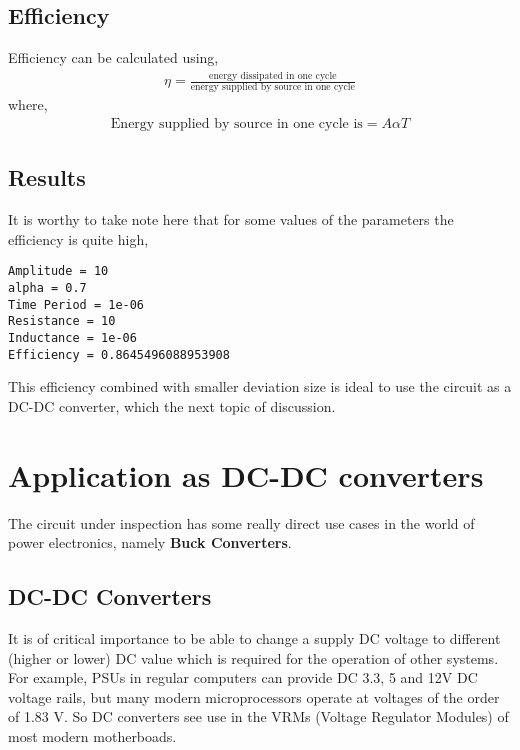  \subsection{Efficiency}
 Efficiency can be calculated using, 
 \begin{align*}
     \eta = \frac{\text{energy dissipated in one cycle}}{\text{energy supplied by source in one cycle}}
 \end{align*}
 where,
 \begin{align*}
    \text{Energy supplied by source in one cycle is} = A \alpha T
 \end{align*}
 \subsection{Results}
 It is worthy to take note here that for some values of the parameters the efficiency is quite high, 
 \begin{verbatim}
Amplitude = 10
alpha = 0.7
Time Period = 1e-06
Resistance = 10
Inductance = 1e-06
Efficiency = 0.8645496088953908    
 \end{verbatim}
This efficiency combined with smaller deviation size is ideal to use the circuit as a DC-DC converter, which the next topic of discussion. 
\section{Application as DC-DC converters}
The circuit under inspection has some really direct use cases in the world of power electronics, namely \textbf{Buck Converters}.
\subsection{DC-DC Converters}
It is of critical importance to be able to change a supply DC voltage to different (higher or lower) DC value which is required for the operation of other systems. For example, PSUs in regular computers can provide DC 3.3, 5 and 12V DC voltage rails, but many modern microprocessors operate at voltages of the order of 1.83 V. So DC converters see use in the VRMs (Voltage Regulator Modules) of most modern motherboads.
